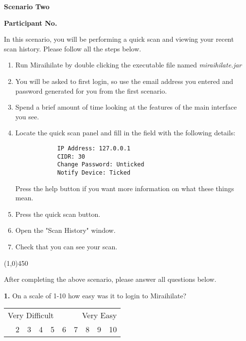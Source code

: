 \begin{center}
	\textbf{Scenario Two}\par
	\textbf{Participant No.}\par
\end{center}

In this scenario, you will be performing a quick scan and viewing your recent scan history. Please follow all the steps below.

\vspace{0.5cm}

\begin{enumerate}
	\item{Run Miraihilate by double clicking the executable file named \textit{miraihilate.jar}}
	\item{You will be asked to first login, so use the email address you entered and password generated for you from the first scenario.}
	\item{Spend a brief amount of time looking at the features of the main interface you see.}
	\item{
		Locate the quick scan panel and fill in the field with the following details:\par
		\begin{lstlisting}
			IP Address: 127.0.0.1
			CIDR: 30
			Change Password: Unticked
			Notify Device: Ticked
		\end{lstlisting}
		\par Press the help button if you want more information on what these things mean.
	}
	\item{Press the quick scan button.}
	\item{Open the "Scan History" window.}
	\item{Check that you can see your scan.}
\end{enumerate}

\begin{center}
	\line(1,0){450}
\end{center}

After completing the above scenario, please answer all questions below.

\vspace{0.5cm}

\textbf{1.} On a scale of 1-10 how easy was it to login to Miraihilate?

\begin{table}[h]
	\centering
	\begin{tabularx}{\textwidth}{XXXXXXXXXX}
		\multicolumn{5}{l}{Very Difficult} & \multicolumn{5}{r}{Very Easy} \\
		\centering
		1    & 2    & 3    & 4    & 5    & 6    & 7    & 8    & 9    & 10
	\end{tabularx}
\end{table}

